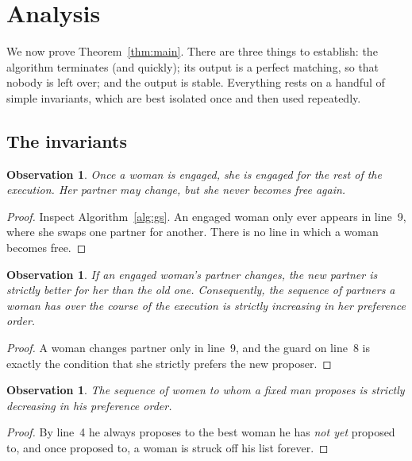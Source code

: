 \documentclass[11pt,a4paper]{article}
\theoremstyle{plain}
\newtheorem{observation}[theorem]{Observation}
\theoremstyle{definition}
\theoremstyle{remark}
\begin{document}
\section{Analysis}\label{sec:analysis}

We now prove Theorem~\ref{thm:main}. There are three things to establish:
the algorithm terminates (and quickly); its output is a perfect matching, so
that nobody is left over; and the output is stable. Everything rests on a
handful of simple invariants, which are best isolated once and then used
repeatedly.

\subsection{The invariants}

\begin{observation}\label{obs:1}
Once a woman is engaged, she is engaged for the rest of the execution.
Her partner may change, but she never becomes free again.
\end{observation}

\begin{proof}
Inspect Algorithm~\ref{alg:gs}. An engaged woman only ever appears in
line~9, where she swaps one partner for another. There is no line in which a
woman becomes free.
\end{proof}

\begin{observation}\label{obs:2}
If an engaged woman's partner changes, the new partner is strictly better for
her than the old one. Consequently, the sequence of partners a woman has over
the course of the execution is strictly increasing in her preference order.
\end{observation}

\begin{proof}
A woman changes partner only in line~9, and the guard on line~8 is exactly the
condition that she strictly prefers the new proposer.
\end{proof}

\begin{observation}\label{obs:3}
The sequence of women to whom a fixed man proposes is strictly decreasing in
his preference order.
\end{observation}

\begin{proof}
By line~4 he always proposes to the best woman he has \emph{not yet} proposed
to, and once proposed to, a woman is struck off his list forever.
\end{proof}
\end{document}
